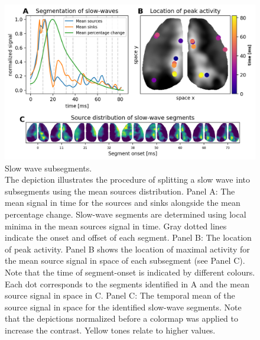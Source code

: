 \begin{figure}[!htb]
\centering
\includegraphics[width=\textwidth,height=\textheight,keepaspectratio]{Figures/slow_wave_subsegements}
\decoRule
\caption[Slow wave subsegments]{Slow wave subsegments.\\The depiction illustrates the procedure of splitting a slow wave into subsegments using the mean sources distribution. Panel A: The mean signal in time for the sources and sinks alongside the mean percentage change. Slow-wave segments are determined using local minima in the mean sources signal in time. Gray dotted lines indicate the onset and offset of each segment. Panel B: The location of peak activity. Panel B shows the location of maximal activity for the mean source signal in space of each subsegment (see Panel C). Note that the time of segment-onset is indicated by different colours. Each dot corresponds to the segments identified in A and the mean source signal in space in C. Panel C: The temporal mean of the source signal in space for the identified slow-wave segments. Note that the depictions normalized before a colormap was applied to increase the contrast. Yellow tones relate to higher values.}
\label{fig:slow_wave_subsegements}
\end{figure}




